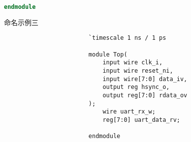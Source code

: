 \documentclass[utf-8, 10pt, a4paper, titlepage, oneside, onecolumn, openany]{ctexart} %
\begin{document}
\begin{enumerate}
\begin{lstlisting}[language = Verilog]
endmodule
\end{lstlisting}

				\begin{table}[h]
					\caption{命名示例三} \label{命名示例三}
				\end{table}

				\begin{shaded}
					\begin{verbatim}
						`timescale 1 ns / 1 ps
						
						module Top(
							input wire clk_i,
							input wire reset_ni,
							input wire[7:0] data_iv,
							output reg hsync_o,
							output reg[7:0] rdata_ov
						);
							wire uart_rx_w;
							reg[7:0] uart_data_rv;

						endmodule
					\end{verbatim}
				\end{shaded}

		\end{enumerate}

	\clearpage
\end{document}

